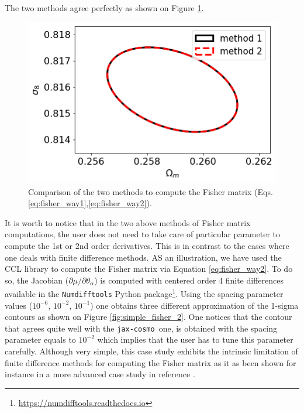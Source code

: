 \documentclass[twocolumn,twocolappendix,nofootinbib,iop]{openjournal}
\newcommand{\jaxcosmo}{\texttt{jax-cosmo}}
\begin{document}
The two methods agree perfectly as shown on Figure \ref{fig:simple_fisher_1}.
\begin{figure}
    \centering
    \includegraphics[width=0.7\columnwidth]{figures/simple_fisher_1.png}
    \caption{Comparison of the two methods to compute the Fisher matrix (Eqs.\ref{eq:fisher_way1},\ref{eq:fisher_way2}).} 
    \label{fig:simple_fisher_1}
\end{figure}
%
It is worth to notice that in the two above methods of Fisher matrix computations, the user does not need to take care of particular parameter to compute the 1st or 2nd order derivatives. This is in contrast to the cases where one deals with finite difference methods. AS an illustration, we have used the CCL library to compute the Fisher matrix via Equation \ref{eq:fisher_way2}. To do so, the Jacobian ($\partial \mu/\partial\theta_\alpha$) is computed with centered  order 4 finite differences available in the \texttt{Numdifftools} Python package\footnote{\url{https://numdifftools.readthedocs.io}}. Using the spacing parameter values ($10^{-6}$, $10^{-2}$, $10^{-1}$) one obtains three different approximation of the 1-sigma contours as shown on Figure \ref{fig:simple_fisher_2}. One notices that the contour that agrees quite well with the \jaxcosmo\ one, is obtained with the spacing parameter equals to $10^{-2}$ which implies that the user has to  tune this parameter carefully. Although very simple, this case study exhibits the intrinsic limitation of finite difference methods for computing the Fisher matrix as it as been shown for instance in a more advanced case study in reference \citet{2021arXiv210100298B}.
\end{document}
